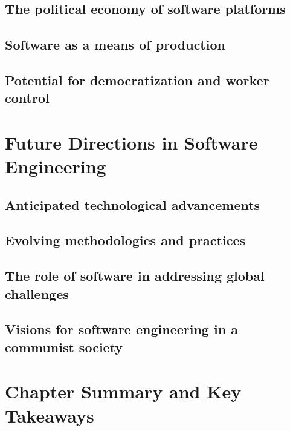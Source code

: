\begin{refsection}
\begin{multicols}{2}
\subsection{The political economy of software platforms}
\subsection{Software as a means of production}
\subsection{Potential for democratization and worker control}
\end{multicols}

\newpage

\section{Future Directions in Software Engineering}
\begin{multicols}{2}
\subsection{Anticipated technological advancements}
\subsection{Evolving methodologies and practices}
\subsection{The role of software in addressing global challenges}
\subsection{Visions for software engineering in a communist society}
\end{multicols}

\newpage

\section{Chapter Summary and Key Takeaways}
\begin{multicols}{2}


\end{multicols}
\printbibliography[heading=subbibliography]
\end{refsection}